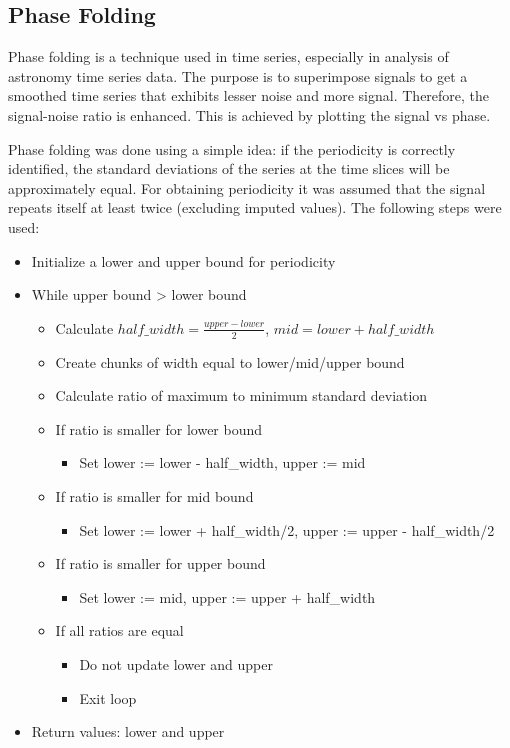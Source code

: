 \documentclass[%
aip,
amsmath,amssymb,
reprint,%
]{revtex4-1}
\begin{document}
\subsection{Phase Folding}

Phase folding is a technique used in time series, especially in analysis of astronomy time series data. The purpose is to superimpose signals to get a smoothed time series that exhibits lesser noise and more signal. Therefore, the signal-noise ratio is enhanced. This is achieved by plotting the signal vs phase.

Phase folding was done using a simple idea: if the periodicity is correctly identified, the standard deviations of the series at the time slices will be approximately equal. For obtaining periodicity it was assumed that the signal repeats itself at least twice (excluding imputed values). The following steps were used:

\begin{itemize}
\item Initialize a lower and upper bound for periodicity
\item While upper bound > lower bound
\begin{itemize}
\item Calculate $half\_width = \frac{upper-lower}{2}$, $mid = lower + half\_width$
\item Create chunks of width equal to lower/mid/upper bound
\item Calculate ratio of maximum to minimum standard deviation
\item If ratio is smaller for lower bound
\begin{itemize}
\item Set lower := lower - half\_width, upper := mid
\end{itemize}
\item If ratio is smaller for mid bound
\begin{itemize}
\item Set lower := lower + half\_width/2, upper := upper - half\_width/2
\end{itemize}
\item If ratio is smaller for upper bound
\begin{itemize}
\item Set lower := mid, upper := upper + half\_width
\end{itemize}
\item If all ratios are equal
\begin{itemize}
\item Do not update lower and upper
\item Exit loop
\end{itemize}
\end{itemize}
\item Return values: lower and upper
\end{itemize}
\end{document}
